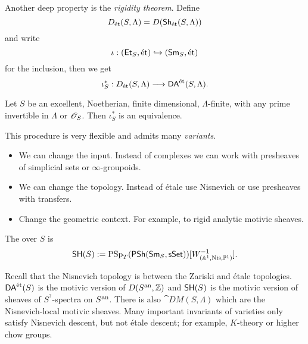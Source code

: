Another deep property is the \emph{rigidity theorem}. Define
\[
D_{\text{\'et}}(S,\Lambda) = D(\mathsf{Sh}_{\text{\'et}}(S,\Lambda))
\] 
and write
\[
\iota : (\mathsf{Et}_S, \text{\'et})\hookrightarrow (\mathsf{Sm}_S,\text{\'et})
\] 
for the inclusion, then we get
\[
\iota_S^{*}:D_{\text{\'et}}(S,\Lambda) \to \DAet(S,\Lambda).
\] 
\begin{theorem}[Ayoub]
	Let $S$ be an excellent, Noetherian, finite dimensional, $\Lambda$-finite, with any prime invertible in $\Lambda$ or $\mathscr{O}_S$. Then $\iota_S^{*}$ is an equivalence.
\end{theorem}

This procedure is very flexible and admits many \emph{variants}.
\begin{itemize}
	\item We can change the input. Instead of complexes we can work with presheaves of simplicial sets or $\infty$-groupoids.
	\item We can change the topology. Instead of \'etale use Nisnevich or use presheaves with transfers.
	\item Change the geometric context. For example, to rigid analytic motivic sheaves.
\end{itemize}

\begin{definition}
	The  over $S$ is
	\[
		\mathsf{SH}(S) := \operatorname{PSp}_T(\mathsf{PSh}(\mathsf{Sm}_S,\mathsf{sSet}))[W^{-1}_{(\mathbb A^{1},\text{Nis},\mathbb{P}^{1})}].
	\] 
\end{definition}
Recall that the Nisnevich topology is between the Zariski and \'etale topologies. $\mathsf{DA}^\text{\'et}(S)$ is the motivic version of $D(S^\text{an},\mathbb Z)$ and $\mathsf{SH}(S)$ is the motivic version of sheaves of $S^{?}$-spectra on $S^\text{an}$. There is also $\cat{DM}(S,\Lambda)$ which are the Nisnevich-local motivic sheaves. Many important invariants of varieties only satisfy Nisnevich descent, but not \'etale descent; for example, $K$-theory or higher chow groups.

